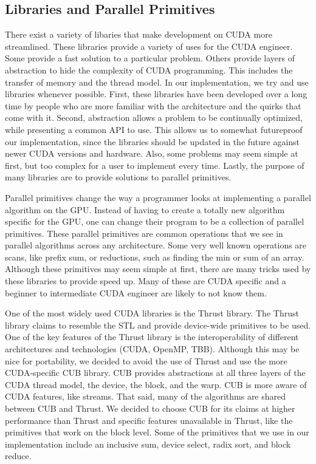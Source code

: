 \subsection{Libraries and Parallel Primitives}

There exist a variety of libaries that make development on CUDA more streamlined.
These libraries provide a variety of uses for the CUDA engineer.
Some provide a fast solution to a particular problem.
Others provide layers of abstraction to hide the complexity of CUDA programming.
This includes the transfer of memory and the thread model.
In our implementation, we try and use libraries whenever possible.
First, these libraries have been developed over a long time by people who are more familiar with the architecture and the quirks that come with it.
Second, abstraction allows a problem to be continually optimized, while presenting a common API to use.
This allows us to somewhat futureproof our implementation, since the libraries should be updated in the future against newer CUDA versions and hardware.
Also, some problems may seem simple at first, but too complex for a user to implement every time.
Lastly, the purpose of many libraries are to provide solutions to parallel primitives.

Parallel primitives change the way a programmer looks at implementing a parallel algorithm on the GPU.
Instead of having to create a totally new algorithm specific for the GPU, one can change their program to be a collection of parallel primitives.
These parallel primitives are common operations that we see in parallel algorithms across any architecture.
Some very well known operations are scans, like prefix sum, or reductions, such as finding the min or sum of an array.
Although these primitives may seem simple at first, there are many tricks used by these libraries to provide speed up.
Many of these are CUDA specific and a beginner to intermediate CUDA engineer are likely to not know them.

One of the most widely used CUDA libraries is the Thrust library.
The Thrust library claims to resemble the STL and provide device-wide primitives to be used.
One of the key features of the Thrust library is the interoperability of different architectures and technologies (CUDA, OpenMP, TBB).
Although this may be nice for portability, we decided to avoid the use of Thrust and use the more CUDA-specific CUB library.
CUB provides abstractions at all three layers of the CUDA thread model, the device, the block, and the warp.
CUB is more aware of CUDA features, like streams.
That said, many of the algorithms are shared between CUB and Thrust.
We decided to choose CUB for its claims at higher performance than Thrust and specific features unavailable in Thrust, like the primitives that work on the block level.
Some of the primitives that we use in our implementation include an inclusive sum, device select, radix sort, and block reduce.

